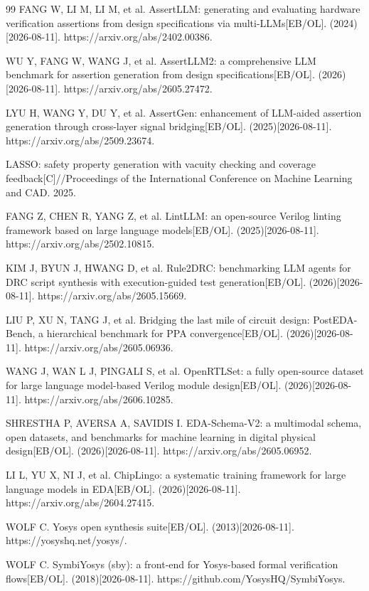 \documentclass[twocolumn,10pt]{ctexart}
\begin{document}
\begin{thebibliography}{99}
 FANG W, LI M, LI M, et al. AssertLLM: generating and evaluating hardware verification assertions from design specifications via multi-LLMs[EB/OL]. (2024)[2026-08-11]. https://arxiv.org/abs/2402.00386.

 WU Y, FANG W, WANG J, et al. AssertLLM2: a comprehensive LLM benchmark for assertion generation from design specifications[EB/OL]. (2026)[2026-08-11]. https://arxiv.org/abs/2605.27472.

 LYU H, WANG Y, DU Y, et al. AssertGen: enhancement of LLM-aided assertion generation through cross-layer signal bridging[EB/OL]. (2025)[2026-08-11]. https://arxiv.org/abs/2509.23674.

 LASSO: safety property generation with vacuity checking and coverage feedback[C]//Proceedings of the International Conference on Machine Learning and CAD. 2025.

 FANG Z, CHEN R, YANG Z, et al. LintLLM: an open-source Verilog linting framework based on large language models[EB/OL]. (2025)[2026-08-11]. https://arxiv.org/abs/2502.10815.

 KIM J, BYUN J, HWANG D, et al. Rule2DRC: benchmarking LLM agents for DRC script synthesis with execution-guided test generation[EB/OL]. (2026)[2026-08-11]. https://arxiv.org/abs/2605.15669.

 LIU P, XU N, TANG J, et al. Bridging the last mile of circuit design: PostEDA-Bench, a hierarchical benchmark for PPA convergence[EB/OL]. (2026)[2026-08-11]. https://arxiv.org/abs/2605.06936.

 WANG J, WAN L J, PINGALI S, et al. OpenRTLSet: a fully open-source dataset for large language model-based Verilog module design[EB/OL]. (2026)[2026-08-11]. https://arxiv.org/abs/2606.10285.

 SHRESTHA P, AVERSA A, SAVIDIS I. EDA-Schema-V2: a multimodal schema, open datasets, and benchmarks for machine learning in digital physical design[EB/OL]. (2026)[2026-08-11]. https://arxiv.org/abs/2605.06952.

 LI L, YU X, NI J, et al. ChipLingo: a systematic training framework for large language models in EDA[EB/OL]. (2026)[2026-08-11]. https://arxiv.org/abs/2604.27415.

 WOLF C. Yosys open synthesis suite[EB/OL]. (2013)[2026-08-11]. https://yosyshq.net/yosys/.

 WOLF C. SymbiYosys (sby): a front-end for Yosys-based formal verification flows[EB/OL]. (2018)[2026-08-11]. https://github.com/YosysHQ/SymbiYosys.


\end{thebibliography}
\end{document}
